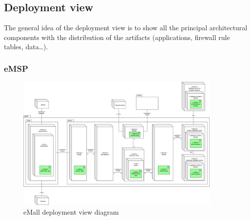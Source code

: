 \subsection{Deployment view}
The general idea of the deployment view is to show all the principal architectural components with the distribution of the artifacts (applications, firewall rule tables, data\ldots).

\subsubsection{\ac{eMSP}}
\begin{figure}[!h]
    \begin{center}
        \includegraphics[keepaspectratio, width=0.9\textwidth]{Graphics/DD-eMSP-deployment.drawio.png}
        \caption{eMall deployment view diagram}
        \label{fig:eMSP-deployment}
    \end{center}
\end{figure}

